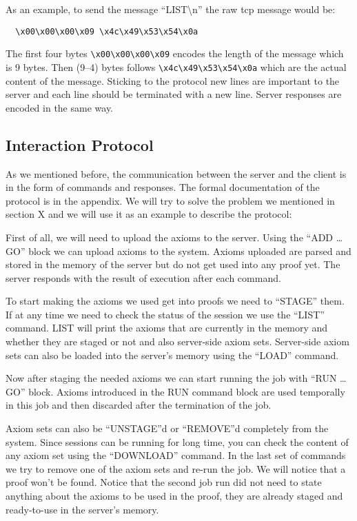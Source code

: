 As an example, to send the message ``LIST\textbackslash{}n'' the raw \ac{tcp} message would be:
\begin{lstlisting}
  \x00\x00\x00\x09 \x4c\x49\x53\x54\x0a
\end{lstlisting}
The first four bytes \lstinline{\x00\x00\x00\x09} encodes the length of the message which is 9 bytes. Then (9--4) bytes follows \lstinline{\x4c\x49\x53\x54\x0a} which are the actual content of the message. Sticking to the protocol new lines are important to the server and each line should be terminated with a new line. Server responses are encoded in the same way.

\subsection{Interaction Protocol}\label{subsec:interactionProtocol}
As we mentioned before, the communication between the server and the client is in the form of commands and responses. The formal documentation of the protocol is in the appendix. We will try to solve the problem we mentioned in section X and we will use it as an example to describe the protocol:

First of all, we will need to upload the axioms to the server. Using the ``ADD \ldots GO'' block we can upload axioms to the system. Axioms uploaded are parsed and stored in the memory of the server but do not get used into any proof yet. The server responds with the result of execution after each command.

To start making the axioms we used get into proofs we need to ``STAGE'' them. If at any time we need to check the status of the session we use the ``LIST'' command. LIST will print the axioms that are currently in the memory and whether they are staged or not and also server-side axiom sets. Server-side axiom sets can also be loaded into the server's memory using the ``LOAD'' command.

Now after staging the needed axioms we can start running the job with ``RUN \ldots GO'' block. Axioms introduced in the RUN command block are used temporally in this job and then discarded after the termination of the job.

Axiom sets can also be ``UNSTAGE''d or ``REMOVE''d completely from the system. Since sessions can be running for long time, you can check the content of any axiom set using the ``DOWNLOAD'' command. In the last set of commands we try to remove one of the axiom sets and re-run the job. We will notice that a proof won't be found. Notice that the second job run did not need to state anything about the axioms to be used in the proof, they are already staged and ready-to-use in the server's memory.
